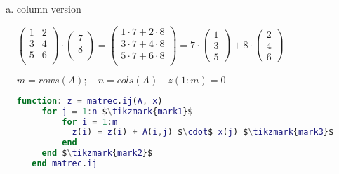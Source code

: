 \begin{frame}[fragile]
	\begin{enumerate}[b)]
		\item column version \vspace{10px}

$\left(  \begin{array}{ll}
   1 & 2\\
   3 & 4\\
   5 & 6\\
\end{array}
\right ) \cdot
\left ( \begin{array}{l}
   7\\
   8\\
\end{array}
\right ) =
\left ( \begin{array}{l}
   1 \cdot 7 + 2 \cdot 8\\
   3 \cdot 7 + 4 \cdot 8\\
   5 \cdot 7 + 6 \cdot 8\\
\end{array}
\right ) = 7 \cdot
\left ( \begin{array}{l}
   1 \\
   3 \\
   5
\end{array}
\right ) + 8 \cdot
 \left ( \begin{array}{l}
   2 \\
   4 \\
   6
\end{array}
\right )
$
\vspace{10px}

$m = rows(A); \quad n = cols(A) \quad z(1:m) = 0$
\vspace{10px}

 \begin{lstlisting}[language=Matlab, mathescape]
  function: z = matrec.ij(A, x)
     for j = 1:n $\tikzmark{mark1}$
         for i = 1:m
	       z(i) = z(i) + A(i,j) $\cdot$ x(j) $\tikzmark{mark3}$
         end
     end $\tikzmark{mark2}$
   end matrec.ij\end{lstlisting}
\end{enumerate}
\end{frame}

